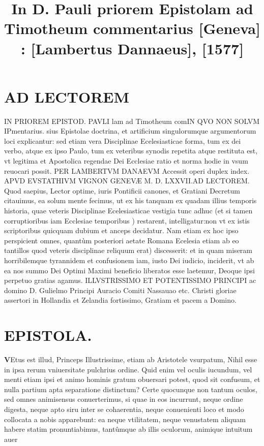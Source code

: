 \documentclass{article}
\begin{document}
\date{}
        \title{In D. Pauli priorem Epistolam ad Timotheum commentarius [Geneva] : [Lambertus Dannaeus], [1577]}
\maketitle
\tableofcontents
\clearpage
\begin{pages} 

\section{AD LECTOREM}
\beginnumbering       
\marginpar{[ p. ]}\pstart IN PRIOREM EPISTOD.  PAVLI lam ad Timotheum comIN QVO NON SOLVM IPmentarius. sius Epistolae doctrina, et artificium singulorumque argumentorum loci explicantur: sed etiam vera Disciplinae Ecelesiasticae forma, tum ex dei verbo, atque ex ipso Paulo, tum ex veteribus synodis repetita atque restituta est, vt legitima et Apostolica regendae Dei Ecclesiae ratio et norma hodie in vsum reuocari possit. PER LAMBERTVM DANAEVM Accessit operi duplex index. APVD EVSTATHIVM VIGNON GENEVÆ M. D. LXXVII.\pend \pstart AD LECTOREM. Quod saepius, Lector optime, iuris Pontificii canones, et Gratiani Decretum citauimus, ea solum mente fecimus, ut ex his tanquam ex quadam illius temporis historia, quae veteris Disciplinae Ecelesiasticae vestigia tunc adhuc (et si tamen corruptioribus iam Ecclesiae temporibus ) restarent, intelligatur:non vt ex istis scriptoribus quicquam dubium et anceps decidatur. Nam etiam ex hoc ipso perspicient omnes, quantùm posteriori aetate Romana Ecelesia etiam ab eo tantillos quod veteris disciplinae reliquum erat) discesserit: et in quam miseram horribilemque tyrannidem et confusionem iam, iusto Dei iudicio, inciderit, vt ab ea nos summo Dei Optimi Maximi beneficio liberatos esse laetemur, Deoque ipsi perpetuo gratias agamus.  \pend\pstart ILLVSTRISSIMO ET POTENTISSIMO PRINCIPI ac domino D. Gulielmo Principi Auracio Comiti Nassauao etc.  Christi gloriae assertori in Hollandia et Zelandia fortissimo, Gratiam et pacem a Domino.  \pend
\endnumbering
\section{EPISTOLA. }
\beginnumbering
\pstart
\textbf{V}Etus est illud, Princeps Illustrissime, etiam ab Aristotele vsurpatum, Nihil esse in ipsa rerum vniuersitate pulchrius ordine. Quid enim vel oculis iucundum, vel menti etiam ipsi et animo hominis gratum obuersari potest, quod sit confusum, et nulla partium apta separatione distinctum? Certe quocunque non tantum oculos, sed omnes animisensus conuerterimus, si quae in eos incurrunt, neque ordine digesta, neque apto siru inter se cohaerentia, neque conuenienti loco et modo collocata a nobis apparebunt: ea neque vtilitatem, neque venustatem aliquam habere statim pronuntiabimus, tantûmque ab illis oculorum, animique intuitum auer\pend

\end{pages}
\end{document}
